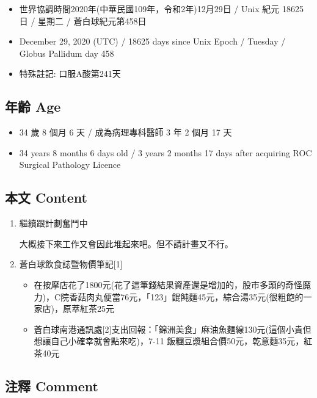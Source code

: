 \documentclass[a5paper, 10pt
]{book}
\providecommand{\tightlist}{%
  \setlength{\itemsep}{0pt}\setlength{\parskip}{0pt}}
\begin{document}
\begin{itemize}
\tightlist
\item
  世界協調時間2020年(中華民國109年，令和2年)12月29日 / Unix 紀元 18625
  日 / 星期二 / 蒼白球紀元第458日
\item
  December 29, 2020 (UTC) / 18625 days since Unix Epoch / Tuesday /
  Globus Pallidum day 458
\item
  特殊註記: 口服A酸第241天
\end{itemize}

\hypertarget{ux5e74ux9f61-age-28}{%
\subsection{年齡 Age}\label{ux5e74ux9f61-age-28}}

\begin{itemize}
\tightlist
\item
  34 歲 8 個月 6 天 / 成為病理專科醫師 3 年 2 個月 17 天
\item
  34 years 8 months 6 days old / 3 years 2 months 17 days after
  acquiring ROC Surgical Pathology Licence
\end{itemize}

\hypertarget{ux672cux6587-content-28}{%
\subsection{本文 Content}\label{ux672cux6587-content-28}}

\begin{enumerate}
\def\labelenumi{\arabic{enumi}.}
\item
  繼續跟計劃奮鬥中

  大概接下來工作又會因此堆起來吧。但不請計畫又不行。
\item
  蒼白球飲食誌暨物價筆記{[}1{]}

  \begin{itemize}
  \tightlist
  \item
    在按摩店花了1800元(花了這筆錢結果資產還是增加的，股市多頭的奇怪魔力)，C院香菇肉丸便當76元，「123」餛飩麵45元，綜合湯35元(很粗飽的一家店)，原萃紅茶25元
  \item
    蒼白球南港通訊處{[}2{]}支出回報：「錦洲美食」麻油魚麵線130元(這個小貴但想讓自己小確幸就會點來吃)，7-11
    飯糰豆漿組合價50元，乾意麵35元，紅茶40元
  \end{itemize}
\end{enumerate}

\hypertarget{ux6ce8ux91cb-comment-28}{%
\subsection{注釋 Comment}\label{ux6ce8ux91cb-comment-28}}
\end{document}
